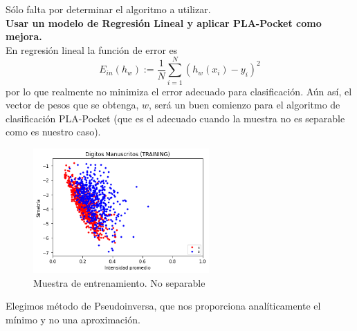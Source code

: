 \documentclass[11pt,a4paper]{article}
\theoremstyle{definition}
\begin{document}
	Sólo falta por determinar el algoritmo a utilizar.\\
	
	\textbf{Usar un modelo de Regresión Lineal y aplicar PLA-Pocket como mejora.}\\
	En regresión lineal la función de error es $$E_{in} (h_w):=\frac{1}{N}\sum_{i=1}^N(h_w(x_i)-y_i)^2$$
	por lo que realmente no minimiza el error adecuado para clasificación. Aún así, el vector de pesos que se obtenga, $w$, será un buen comienzo para el algoritmo de clasificación PLA-Pocket (que es el adecuado cuando la muestra no es separable como es nuestro caso).
	\begin{figure}[H]
		\centering
		\includegraphics[width=0.6\textwidth]{images/bonus1}
		\caption{Muestra de entrenamiento. No separable}
	\end{figure}
	
	Elegimos método de Pseudoinversa, que nos proporciona analíticamente el mínimo y no una aproximación.
	
\end{document}
